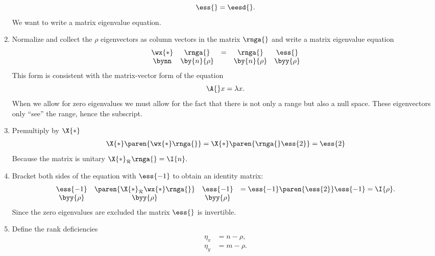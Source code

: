 \begin{enumerate}
\begin{equation}
  \ess{} = \eesd{}.
\end{equation}
\subitem We want to write a matrix eigenvalue equation.
\item {} Normalize and collect the $\rho$ eigenvectors as column vectors in the matrix $\rnga{}$ and write a matrix eigenvalue equation
\begin{equation}
\begin{array}{ccccc}
  \wx{*}&\rnga{} &=& \rnga{}&\ess{}\\
  \bynn & \by{n}{\rho} && \by{n}{\rho} & \byy{\rho}
  \label{eq:proofs:a}
\end{array}
\end{equation}
\subitem This form is consistent with the matrix-vector form of the equation
\begin{equation}
  \A{}x = \lambda x.
\end{equation}
\subitem When we allow for zero eigenvalues we must allow for the fact that there is not only a range but also a null space. These eigenvectors only ``see'' the range, hence the subscript.
\item Premultiply by $\X{*}$
\begin{equation}
  \begin{split}
     \X{*}\paren{\wx{*}\rnga{}} = \X{*}\paren{\rnga{}\ess{2}} = \ess{2}
   \end{split}
 \label{eq:proofs:b}
\end{equation}
\subitem Because the matrix is unitary $\X{*}_{\mathcal{R}}\rnga{} = \I{n}.$
\item Bracket both sides of the equation with $\ess{-1}$ to obtain an identity matrix:
\begin{equation}
\begin{array}{cccl}
  \ess{-1} & \paren{\X{*}_{\mathcal{R}}\wx{*}\rnga{}} & \ess{-1} & = \ess{-1}\paren{\ess{2}}\ess{-1} = \I{\rho}.\\
  \byy{\rho} & \byy{\rho} & \byy{\rho} 
\end{array}
\end{equation}
\subitem Since the zero eigenvalues are excluded the matrix $\ess{}$ is invertible.
\item Define the rank deficiencies
\begin{equation}
  \begin{split}
     \eta_{x} &= n - \rho,\\
     \eta_{y} &= m - \rho.

\end{split}
\end{equation}
\end{enumerate}
